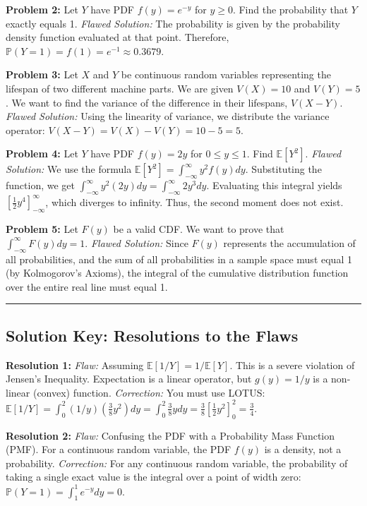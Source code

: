 \documentclass[11pt, a4paper]{article}
\theoremstyle{definition}
\theoremstyle{remark}
\newcommand{\E}{\mathbb{E}}
\newcommand{\Prob}{\mathbb{P}}
\begin{document}
\textbf{Problem 2:} Let $Y$ have PDF $f(y) = e^{-y}$ for $y \ge 0$. Find the probability that $Y$ exactly equals 1.
\textit{Flawed Solution:} The probability is given by the probability density function evaluated at that point. Therefore, $\Prob(Y = 1) = f(1) = e^{-1} \approx 0.3679$.

\textbf{Problem 3:} Let $X$ and $Y$ be continuous random variables representing the lifespan of two different machine parts. We are given $V(X) = 10$ and $V(Y) = 5$. We want to find the variance of the difference in their lifespans, $V(X - Y)$.
\textit{Flawed Solution:} Using the linearity of variance, we distribute the variance operator: $V(X - Y) = V(X) - V(Y) = 10 - 5 = 5$.

\textbf{Problem 4:} Let $Y$ have PDF $f(y) = 2y$ for $0 \le y \le 1$. Find $\E[Y^2]$.
\textit{Flawed Solution:} We use the formula $\E[Y^2] = \int_{-\infty}^{\infty} y^2 f(y) dy$. Substituting the function, we get $\int_{-\infty}^{\infty} y^2 (2y) dy = \int_{-\infty}^{\infty} 2y^3 dy$. Evaluating this integral yields $[\frac{1}{2}y^4]_{-\infty}^{\infty}$, which diverges to infinity. Thus, the second moment does not exist.

\textbf{Problem 5:} Let $F(y)$ be a valid CDF. We want to prove that $\int_{-\infty}^{\infty} F(y) dy = 1$.
\textit{Flawed Solution:} Since $F(y)$ represents the accumulation of all probabilities, and the sum of all probabilities in a sample space must equal 1 (by Kolmogorov's Axioms), the integral of the cumulative distribution function over the entire real line must equal 1.

\vspace{1cm}
\hrule
\vspace{0.5cm}
\subsection*{Solution Key: Resolutions to the Flaws}

\textbf{Resolution 1:} \textit{Flaw:} Assuming $\E[1/Y] = 1/\E[Y]$. This is a severe violation of Jensen's Inequality. Expectation is a linear operator, but $g(y) = 1/y$ is a non-linear (convex) function. 
\textit{Correction:} You must use LOTUS: $\E[1/Y] = \int_{0}^{2} (1/y)(\frac{3}{8}y^2) dy = \int_{0}^{2} \frac{3}{8}y dy = \frac{3}{8}[\frac{1}{2}y^2]_0^2 = \frac{3}{4}$.

\textbf{Resolution 2:} \textit{Flaw:} Confusing the PDF with a Probability Mass Function (PMF). For a continuous random variable, the PDF $f(y)$ is a density, not a probability.
\textit{Correction:} For any continuous random variable, the probability of taking a single exact value is the integral over a point of width zero: $\Prob(Y = 1) = \int_{1}^{1} e^{-y} dy = 0$.
\end{document}
